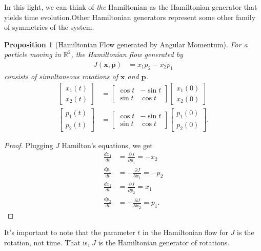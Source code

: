 \documentclass[10pt]{extarticle}
\newcommand{\R}{\mathbb{R}}
\theoremstyle{plain}
\newtheorem*{proposition}{Proposition}%
\theoremstyle{definition}
\theoremstyle{remark}
\renewcommand{\newline}{\hfill\break}
\begin{document}
  In this light, we can think of \textit{the} Hamiltonian as the Hamiltonian generator that yields time evolution.Other Hamiltonian generators represent some other family of symmetries of the system.
  \begin{proposition}[Hamiltonian Flow generated by Angular Momentum]
    For a particle moving in $\R^2$, the Hamiltonian  flow generated by 
    \begin{align*}
      J(\mathbf{x},\mathbf{p}) &= x_1p_2 - x_2p_1
    \end{align*}
    consists of simultaneous rotations of $\mathbf{x}$ and $\mathbf{p}$.
    \begin{align*}
      \begin{bmatrix}x_1(t)\\x_2(t)\end{bmatrix} &= \begin{bmatrix}\cos t & -\sin t\\\sin t& \cos t\end{bmatrix} \begin{bmatrix}x_1(0)\\x_2(0)\end{bmatrix}\\
      \begin{bmatrix}p_1(t)\\p_2(t)\end{bmatrix} &= \begin{bmatrix}\cos t & -\sin t \\ \sin t & \cos t\end{bmatrix} \begin{bmatrix}p_1(0) \\ p_2(0)\end{bmatrix}.
    \end{align*}
  \end{proposition}
  \begin{proof}
    Plugging $J$ Hamilton's equations, we get
        \begin{align*}
          \frac{dx_1}{dt} &= \frac{\partial J}{\partial p_1} = -x_2\\
          \frac{dp_1}{dt} &= -\frac{\partial J}{\partial x_1} = -p_2\\
          \frac{dx_2}{dt} &= \frac{\partial J}{\partial p_2} = x_1\\
          \frac{dp_2}{dt} &= -\frac{\partial J}{\partial x_2} = p_1.
        \end{align*}
  \end{proof}
  It's important to note that the parameter $t$ in the Hamiltonian flow for $J$ is the rotation, not time. That is, $J$ is the Hamiltonian generator of rotations.\newline
\end{document}
